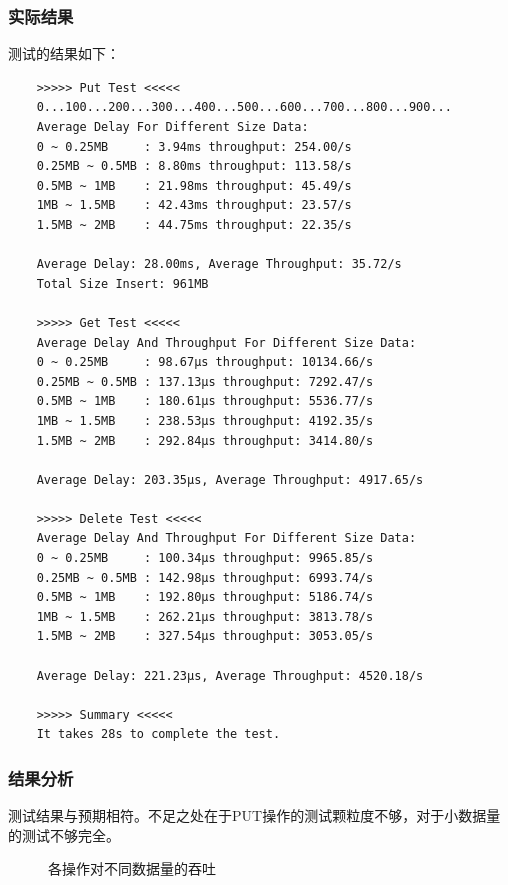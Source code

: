 \documentclass{ctexart}
\begin{document}
\subsubsection{实际结果}
测试的结果如下：
\begin{verbatim}
    >>>>> Put Test <<<<<
    0...100...200...300...400...500...600...700...800...900...
    Average Delay For Different Size Data:
    0 ~ 0.25MB     : 3.94ms throughput: 254.00/s
    0.25MB ~ 0.5MB : 8.80ms throughput: 113.58/s
    0.5MB ~ 1MB    : 21.98ms throughput: 45.49/s
    1MB ~ 1.5MB    : 42.43ms throughput: 23.57/s
    1.5MB ~ 2MB    : 44.75ms throughput: 22.35/s
    
    Average Delay: 28.00ms, Average Throughput: 35.72/s
    Total Size Insert: 961MB
    
    >>>>> Get Test <<<<<
    Average Delay And Throughput For Different Size Data:
    0 ~ 0.25MB     : 98.67µs throughput: 10134.66/s
    0.25MB ~ 0.5MB : 137.13µs throughput: 7292.47/s
    0.5MB ~ 1MB    : 180.61µs throughput: 5536.77/s
    1MB ~ 1.5MB    : 238.53µs throughput: 4192.35/s
    1.5MB ~ 2MB    : 292.84µs throughput: 3414.80/s
    
    Average Delay: 203.35µs, Average Throughput: 4917.65/s
    
    >>>>> Delete Test <<<<<
    Average Delay And Throughput For Different Size Data:
    0 ~ 0.25MB     : 100.34µs throughput: 9965.85/s
    0.25MB ~ 0.5MB : 142.98µs throughput: 6993.74/s
    0.5MB ~ 1MB    : 192.80µs throughput: 5186.74/s
    1MB ~ 1.5MB    : 262.21µs throughput: 3813.78/s
    1.5MB ~ 2MB    : 327.54µs throughput: 3053.05/s
    
    Average Delay: 221.23µs, Average Throughput: 4520.18/s
    
    >>>>> Summary <<<<<
    It takes 28s to complete the test.
\end{verbatim}

\subsubsection{结果分析}
测试结果与预期相符。不足之处在于PUT操作的测试颗粒度不够，对于小数据量的测试不够完全。
\begin{figure}[h!]
  \centering
  \caption{各操作对不同数据量的吞吐}
\end{figure}
\end{document}
